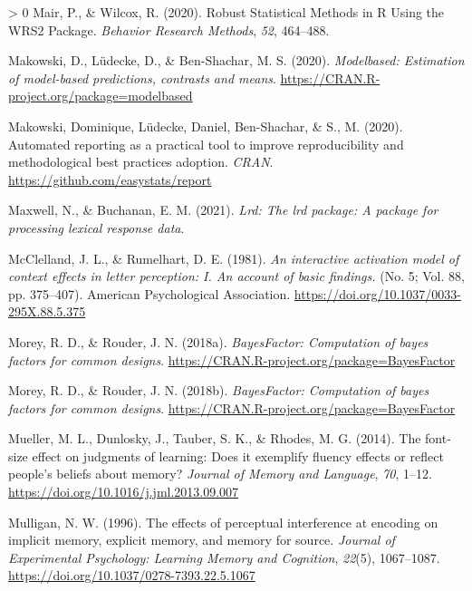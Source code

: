 \documentclass[
  english,
  jou]{apa7}
\newlength{\cslhangindent}
\newenvironment{CSLReferences}[3] %
 {%
  \setlength{\parindent}{0pt}
  \ifodd #1 \everypar{\setlength{\hangindent}{\cslhangindent}}\ignorespaces\fi
  \ifnum #2 > 0
  \setlength{\parskip}{#2\baselineskip}
  \fi
 }%
 {}
\begin{document}
\begin{CSLReferences}{1}{0}
\leavevmode\hypertarget{ref-R-WRS2}{}%
Mair, P., \& Wilcox, R. (2020). {Robust Statistical Methods in R Using the WRS2 Package}. \emph{Behavior Research Methods}, \emph{52}, 464--488.

\leavevmode\hypertarget{ref-R-modelbased}{}%
Makowski, D., Lüdecke, D., \& Ben-Shachar, M. S. (2020). \emph{Modelbased: Estimation of model-based predictions, contrasts and means}. \url{https://CRAN.R-project.org/package=modelbased}

\leavevmode\hypertarget{ref-R-report}{}%
Makowski, Dominique, Lüdecke, Daniel, Ben-Shachar, \& S., M. (2020). Automated reporting as a practical tool to improve reproducibility and methodological best practices adoption. \emph{CRAN}. \url{https://github.com/easystats/report}

\leavevmode\hypertarget{ref-R-lrd}{}%
Maxwell, N., \& Buchanan, E. M. (2021). \emph{Lrd: The lrd package: A package for processing lexical response data}.

\leavevmode\hypertarget{ref-McClelland1981}{}%
McClelland, J. L., \& Rumelhart, D. E. (1981). \emph{{An interactive activation model of context effects in letter perception: I. An account of basic findings.}} (No. 5; Vol. 88, pp. 375--407). American Psychological Association. \url{https://doi.org/10.1037/0033-295X.88.5.375}

\leavevmode\hypertarget{ref-Morey2018}{}%
Morey, R. D., \& Rouder, J. N. (2018a). \emph{BayesFactor: Computation of bayes factors for common designs}. \url{https://CRAN.R-project.org/package=BayesFactor}

\leavevmode\hypertarget{ref-R-BayesFactor}{}%
Morey, R. D., \& Rouder, J. N. (2018b). \emph{BayesFactor: Computation of bayes factors for common designs}. \url{https://CRAN.R-project.org/package=BayesFactor}

\leavevmode\hypertarget{ref-Mueller2014}{}%
Mueller, M. L., Dunlosky, J., Tauber, S. K., \& Rhodes, M. G. (2014). {The font-size effect on judgments of learning: Does it exemplify fluency effects or reflect people's beliefs about memory?} \emph{Journal of Memory and Language}, \emph{70}, 1--12. \url{https://doi.org/10.1016/j.jml.2013.09.007}

\leavevmode\hypertarget{ref-Mulligan1996}{}%
Mulligan, N. W. (1996). {The effects of perceptual interference at encoding on implicit memory, explicit memory, and memory for source}. \emph{Journal of Experimental Psychology: Learning Memory and Cognition}, \emph{22}(5), 1067--1087. \url{https://doi.org/10.1037/0278-7393.22.5.1067}


\end{CSLReferences}
\end{document}
